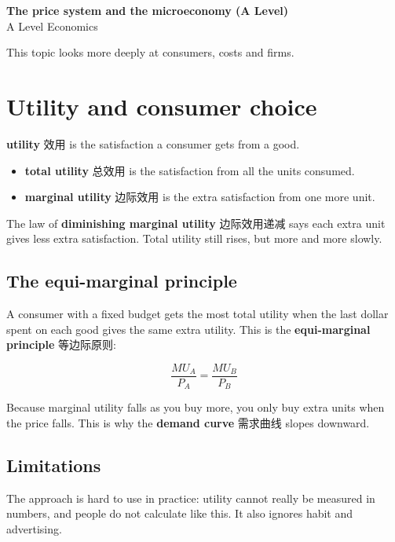 \documentclass[11pt]{article}
\begin{document}
\begin{center}
  {\LARGE\bfseries The price system and the microeconomy (A Level)}\\[0.35em]
  {\large A Level Economics}
\end{center}
\vspace{0.6em}

This topic looks more deeply at consumers, costs and firms.

\section*{Utility and consumer choice}

\textbf{utility} 效用 is the satisfaction a consumer gets from a good.

\begin{itemize}
\item \textbf{total utility} 总效用 is the satisfaction from all the units consumed.

\item \textbf{marginal utility} 边际效用 is the extra satisfaction from one more unit.

\end{itemize}

The law of \textbf{diminishing marginal utility} 边际效用递减 says each extra unit gives less extra satisfaction. Total utility still rises, but more and more slowly.

\subsection*{The equi-marginal principle}

A consumer with a fixed budget gets the most total utility when the last dollar spent on each good gives the same extra utility. This is the \textbf{equi-marginal principle} 等边际原则:

\[
\frac{MU_A}{P_A} = \frac{MU_B}{P_B}
\]

Because marginal utility falls as you buy more, you only buy extra units when the price falls. This is why the \textbf{demand curve} 需求曲线 slopes downward.

\subsection*{Limitations}

The approach is hard to use in practice: utility cannot really be measured in numbers, and people do not calculate like this. It also ignores habit and advertising.
\end{document}
